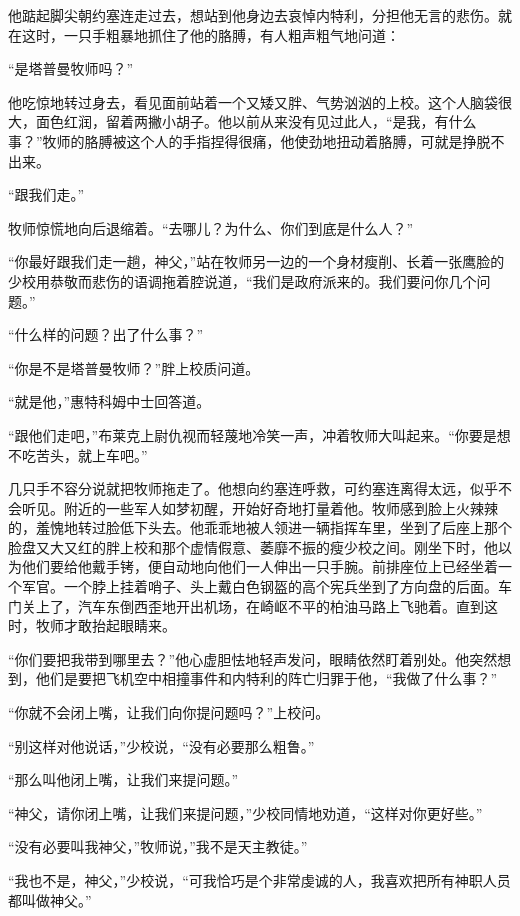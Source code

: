  


    他踮起脚尖朝约塞连走过去，想站到他身边去哀悼内特利，分担他无言的悲伤。就在这时，一只手粗暴地抓住了他的胳膊，有人粗声粗气地问道：

    “是塔普曼牧师吗？”

    他吃惊地转过身去，看见面前站着一个又矮又胖、气势汹汹的上校。这个人脑袋很大，面色红润，留着两撇小胡子。他以前从来没有见过此人，“是我，有什么事？”牧师的胳膊被这个人的手指捏得很痛，他使劲地扭动着胳膊，可就是挣脱不出来。

    “跟我们走。”

    牧师惊慌地向后退缩着。“去哪儿？为什么、你们到底是什么人？”

    “你最好跟我们走一趟，神父，”站在牧师另一边的一个身材瘦削、长着一张鹰脸的少校用恭敬而悲伤的语调拖着腔说道，“我们是政府派来的。我们要问你几个问题。”

    “什么样的问题？出了什么事？”

    “你是不是塔普曼牧师？”胖上校质问道。

    “就是他，”惠特科姆中士回答道。

    “跟他们走吧，”布莱克上尉仇视而轻蔑地冷笑一声，冲着牧师大叫起来。“你要是想不吃苦头，就上车吧。”

    几只手不容分说就把牧师拖走了。他想向约塞连呼救，可约塞连离得太远，似乎不会听见。附近的一些军人如梦初醒，开始好奇地打量着他。牧师感到脸上火辣辣的，羞愧地转过脸低下头去。他乖乖地被人领进一辆指挥车里，坐到了后座上那个脸盘又大又红的胖上校和那个虚情假意、萎靡不振的瘦少校之间。刚坐下时，他以为他们要给他戴手铐，便自动地向他们一人伸出一只手腕。前排座位上已经坐着一个军官。一个脖上挂着哨子、头上戴白色钢盔的高个宪兵坐到了方向盘的后面。车门关上了，汽车东倒西歪地开出机场，在崎岖不平的柏油马路上飞驰着。直到这时，牧师才敢抬起眼睛来。

    “你们要把我带到哪里去？”他心虚胆怯地轻声发问，眼睛依然盯着别处。他突然想到，他们是要把飞机空中相撞事件和内特利的阵亡归罪于他，“我做了什么事？”

    “你就不会闭上嘴，让我们向你提问题吗？”上校问。

    “别这样对他说话，”少校说，“没有必要那么粗鲁。”

    “那么叫他闭上嘴，让我们来提问题。”

    “神父，请你闭上嘴，让我们来提问题，”少校同情地劝道，“这样对你更好些。”

    “没有必要叫我神父，”牧师说，”我不是天主教徒。”

    “我也不是，神父，”少校说，“可我恰巧是个非常虔诚的人，我喜欢把所有神职人员都叫做神父。”

